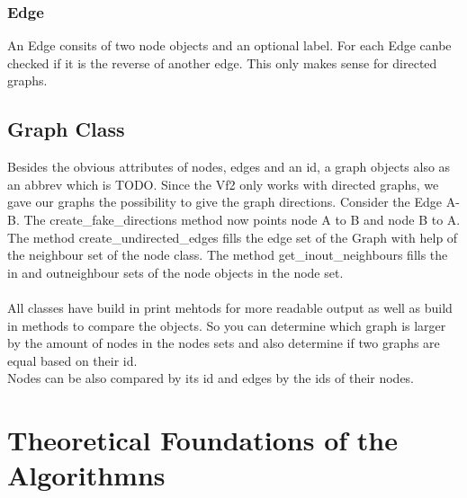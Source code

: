 \documentclass{SeminarV2}
\begin{document}
\subsubsection{Edge}
An Edge consits of two node objects and an optional label. For each Edge canbe checked if it is the reverse of another edge. This only makes sense for directed graphs.
\subsection{Graph Class}
Besides the obvious attributes of nodes, edges and an id, a graph objects also as an
abbrev which is TODO. Since the Vf2 only works with directed graphs, we 
gave our graphs the possibility to give the graph directions. Consider the Edge A-B. The 
create\_fake\_directions method now points node A to B and node B to A.\\
The method create\_undirected\_edges fills the edge set of the Graph with help of the neighbour set of the node class. The method get\_inout\_neighbours fills the in and outneighbour sets of the node objects in the node set.\\\\
All classes have build in print mehtods for more readable output as well as build in 
methods to compare the objects. So you can determine which graph is larger by the amount of 
nodes in the nodes sets and also determine if two graphs are equal based on their id.\\
Nodes can be also compared by its id and edges by the ids of their nodes.
\section{Theoretical Foundations of the Algorithmns}
\end{document}
